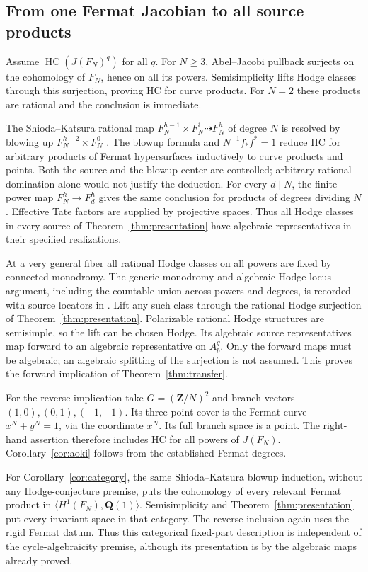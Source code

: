 \documentclass[11pt]{article}
\theoremstyle{remark}\newtheorem{remark}[theorem]{Remark}
\newcommand{\Q}{\mathbf Q}\newcommand{\C}{\mathbf C}
\newcommand{\Z}{\mathbf Z}\newcommand{\PP}{\mathbf P}
\DeclareMathOperator{\HC}{HC}\DeclareMathOperator{\CH}{CH}
\begin{document}
\subsection{From one Fermat Jacobian to all source products}
Assume $\HC(J(F_N)^q)$ for all $q$. For $N\geq3$, Abel--Jacobi pullback
surjects on the cohomology of $F_N$, hence on all its powers. Semisimplicity
lifts Hodge classes through this surjection, proving HC for curve products.
For $N=2$ these products are rational and the conclusion is immediate.

The Shioda--Katsura rational map
$F_N^{h-1}\times F_N^1\dashrightarrow F_N^h$ of degree $N$ is resolved
by blowing up $F_N^{h-2}\times F_N^0$ \cite[Lemmas 1.1--1.2]{SK}.
The blowup formula and $N^{-1}f_*f^*=1$ reduce HC for arbitrary products
of Fermat hypersurfaces inductively to curve products and points. Both
the source and the blowup center are controlled; arbitrary rational
domination alone would not justify the deduction. For every $d\mid N$,
the finite power map $F_N^h\to F_d^h$ gives the same conclusion for
products of degrees dividing $N$. Effective Tate factors are supplied by
projective spaces. Thus all Hodge classes in every source of
Theorem~\ref{thm:presentation} have algebraic representatives in their
specified realizations.

At a very general fiber all rational Hodge classes on all powers are
fixed by connected monodromy. The generic-monodromy and algebraic
Hodge-locus argument, including the countable union across powers and
degrees, is recorded with source locators in \cite[Section 6]{General}.
Lift any such class through the rational Hodge surjection of
Theorem~\ref{thm:presentation}. Polarizable rational Hodge structures
are semisimple, so the lift can be chosen Hodge. Its algebraic source
representatives map forward to an algebraic representative on $A_b^q$.
Only the forward maps must be algebraic; an algebraic splitting of the
surjection is not assumed. This proves the forward implication of
Theorem~\ref{thm:transfer}.

For the reverse implication take $G=(\Z/N)^2$ and branch vectors
$(1,0),(0,1),(-1,-1)$. Its three-point cover is the Fermat curve
$x^N+y^N=1$, via the coordinate $x^N$. Its full branch space is a point.
The right-hand assertion therefore includes HC for all powers of $J(F_N)$.
Corollary~\ref{cor:aoki} follows from the established Fermat degrees.

For Corollary~\ref{cor:category}, the same Shioda--Katsura blowup induction,
without any Hodge-conjecture premise, puts the cohomology of every relevant
Fermat product in $\langle H^1(F_N),\Q(1)\rangle$. Semisimplicity and
Theorem~\ref{thm:presentation} put every invariant space in that category.
The reverse inclusion again uses the rigid Fermat datum. Thus this
categorical fixed-part description is independent of the cycle-algebraicity
premise, although its presentation is by the algebraic maps already proved.
\end{document}
